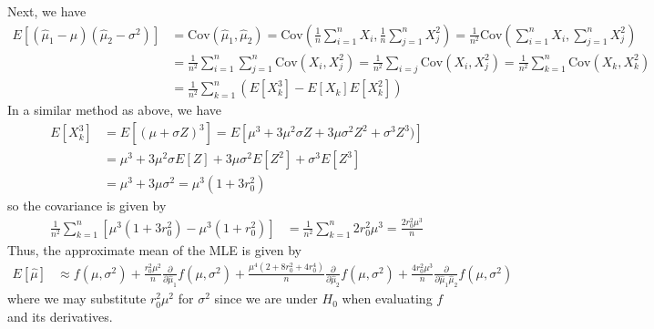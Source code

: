 \documentclass{article}
\newcommand{\cov}{\mathrm{Cov}}
\begin{document}
\begin{itemize}
\begin{enumerate}[(a)]
\begin{soln}
					Next, we have 
					\begin{align*}
						E[(\hat\mu_1-\mu)(\hat\mu_2-\sigma^2)] &= \cov(\hat\mu_1, \hat\mu_2) = \cov\left( \frac{1}{n}\sum_{i=1}^{n} X_i, \frac{1}{n} \sum_{j=1}^{n} X_j^2 \right) = \frac{1}{n^2}\cov\left( \sum_{i=1}^{n} X_i, \sum_{j=1}^{n} X_j^2 \right) \\
						&= \frac{1}{n^2} \sum_{i=1}^{n} \sum_{j=1}^{n} \cov(X_i, X_j^2) = \frac{1}{n^2} \sum_{i=j}^{} \cov(X_i, X_j^2) = \frac{1}{n^2}\sum_{k=1}^{n} \cov(X_k, X_k^2) \\
						&= \frac{1}{n^2}\sum_{k=1}^{n} (E[X_k^3]-E[X_k]E[X_k^2]) 
					\end{align*}
					In a similar method as above, we have 
					\begin{align*}
						E[X_k^3] &= E[(\mu+\sigma Z)^3] = E\left[ \mu^3+3\mu^2 \sigma Z + 3\mu \sigma^2 Z^2 + \sigma^3 Z^3) \right] \\
						&= \mu^3 + 3\mu^2\sigma E[Z] + 3\mu\sigma^2 E[Z^2] + \sigma^3 E[Z^3] \\
						&= \mu^3 + 3\mu\sigma^2 = \mu^3 (1+3r_0^2)
					\end{align*}
					so the covariance is given by
					\begin{align*}
						\frac{1}{n^2} \sum_{k=1}^{n} \left[ \mu^3(1+3r_0^2) -\mu^3(1+r_0^2)  \right] &= \frac{1}{n^2}\sum_{k=1}^{n} 2r_0^2 \mu^3 = \frac{2r_0^2\mu^3}{n}
					\end{align*}
					Thus, the approximate mean of the MLE is given by 
					\begin{align*}
						E[\hat\mu] &\approx f(\mu, \sigma^2) + \frac{r_0^2\mu^2}{n}\frac{\partial}{\partial\hat\mu_1}f(\mu, \sigma^2) + \frac{\mu^4(2+8r_0^2+4r_0^4)}{n} \frac{\partial}{\partial\hat\mu_2}f(\mu, \sigma^2) + \frac{4r_0^2\mu^3}{n}\frac{\partial}{\partial\hat\mu_1\hat\mu_2}f(\mu, \sigma^2) 
					\end{align*}
					where we may substitute $r_0^2\mu^2$ for $\sigma^2$ since we are under $H_0$ when evaluating $f$ and its derivatives.


\end{soln}
\end{enumerate}
\end{itemize}
\end{document}
